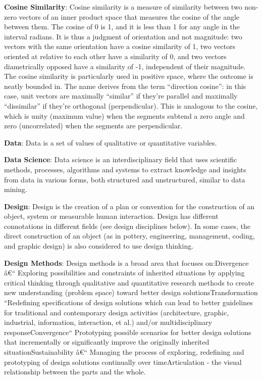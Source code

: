 \documentclass[b5paper,]{book}
\newcommand{\euro}{€}
\theoremstyle{definition}
\theoremstyle{definition}
\theoremstyle{definition}
\theoremstyle{remark}
\begin{document}
\textbf{Cosine Similarity}: Cosine similarity is a measure of similarity
between two non-zero vectors of an inner product space that measures the
cosine of the angle between them. The cosine of 0 is 1, and it is less
than 1 for any angle in the interval radians. It is thus a judgment of
orientation and not magnitude: two vectors with the same orientation
have a cosine similarity of 1, two vectors oriented at relative to each
other have a similarity of 0, and two vectors diametrically opposed have
a similarity of -1, independent of their magnitude. The cosine
similarity is particularly used in positive space, where the outcome is
neatly bounded in. The name derives from the term ``direction cosine'':
in this case, unit vectors are maximally ``similar'' if they're parallel
and maximally ``dissimilar'' if they're orthogonal (perpendicular). This
is analogous to the cosine, which is unity (maximum value) when the
segments subtend a zero angle and zero (uncorrelated) when the segments
are perpendicular.

\textbf{Data}: Data is a set of values of qualitative or quantitative
variables.

\textbf{Data Science}: Data science is an interdisciplinary field that
uses scientific methods, processes, algorithms and systems to extract
knowledge and insights from data in various forms, both structured and
unstructured, similar to data mining.

\textbf{Design}: Design is the creation of a plan or convention for the
construction of an object, system or measurable human interaction.
Design has different connotations in different fields (see design
disciplines below). In some cases, the direct construction of an object
(as in pottery, engineering, management, coding, and graphic design) is
also considered to use design thinking.

\textbf{Design Methods}: Design methods is a broad area that focuses
on:Divergence â\euro{}`` Exploring possibilities and constraints of
inherited situations by applying critical thinking through qualitative
and quantitative research methods to create new understanding (problem
space) toward better design solutionsTransformation ``Redefining
specifications of design solutions which can lead to better guidelines
for traditional and contemporary design activities (architecture,
graphic, industrial, information, interaction, et al.) and/or
multidisciplinary responseConvergence`` Prototyping possible scenarios
for better design solutions that incrementally or significantly improve
the originally inherited situationSustainability â\euro{}`` Managing the
process of exploring, redefining and prototyping of design solutions
continually over timeArticulation - the visual relationship between the
parts and the whole.
\end{document}
